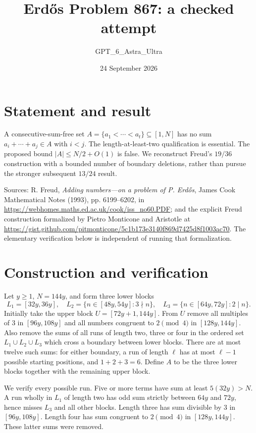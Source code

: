 \documentclass[11pt]{article}
\begin{document}
\title{Erd\H{o}s Problem 867: a checked attempt}
\author{GPT\_6\_Astra\_Ultra}
\date{24 September 2026}
\maketitle

\section*{Statement and result}
A consecutive-sum-free set $A=\{a_1<\cdots<a_t\}\subseteq[1,N]$ has no sum $a_i+\cdots+a_j\in A$ with $i<j$. The length-at-least-two qualification is essential. The proposed bound $|A|\le N/2+O(1)$ is false. We reconstruct Freud's $19/36$ construction with a bounded number of boundary deletions, rather than pursue the stronger subsequent $13/24$ result.

Sources: R. Freud, \emph{Adding numbers---on a problem of P. Erd\H{o}s}, James Cook Mathematical Notes (1993), pp. 6199--6202, in \url{https://webhomes.maths.ed.ac.uk/cook/iss_no60.PDF}; and the explicit Freud construction formalized by Pietro Monticone and Aristotle at \url{https://gist.github.com/pitmonticone/5c1b173e3140f869d7425d8f1003ac70}. The elementary verification below is independent of running that formalization.

\section*{Construction and verification}
Let $y\ge1$, $N=144y$, and form three lower blocks
\[
 L_1=[32y,36y],\quad L_2=\{n\in[48y,54y]:3\nmid n\},\quad
 L_3=\{n\in[64y,72y]:2\mid n\}.
\]
Initially take the upper block $U=[72y+1,144y]$. From $U$ remove all multiples of $3$ in $[96y,108y]$ and all numbers congruent to $2\pmod4$ in $[128y,144y]$. Also remove the sums of all runs of length two, three or four in the ordered set $L_1\cup L_2\cup L_3$ which cross a boundary between lower blocks. There are at most twelve such sums: for either boundary, a run of length $\ell$ has at most $\ell-1$ possible starting positions, and $1+2+3=6$. Define $A$ to be the three lower blocks together with the remaining upper block.

We verify every possible run. Five or more terms have sum at least $5(32y)>N$. A run wholly in $L_1$ of length two has odd sum strictly between $64y$ and $72y$, hence misses $L_3$ and all other blocks. Length three has sum divisible by $3$ in $[96y,108y]$. Length four has sum congruent to $2\pmod4$ in $[128y,144y]$. These latter sums were removed.
\end{document}
